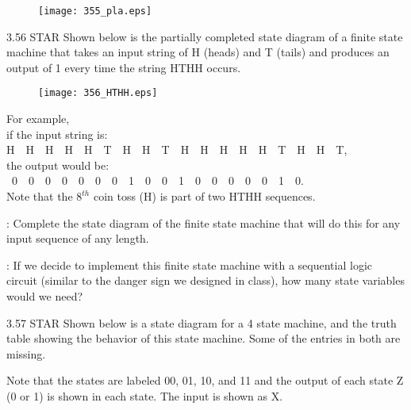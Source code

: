\documentclass{patt}
\begin{document}
\begin{exercises}
\vspace{0.2in}
\begin{figure}[h]
\centering
\texttt{[image: 355\_pla.eps]}
\end{figure}

\newpage

\item[3.56]STAR Shown below is the partially completed state diagram of a
finite state machine that takes an input string of H (heads) and T
(tails) and produces an output of 1 every time the string HTHH occurs.

\vspace{1in}
\begin{figure}[h]
\centering
    \texttt{[image: 356\_HTHH.eps]}
\end{figure}

\noindent For example,\\

        if the input string is: {\ttfamily H\ \ H\ \ H\ \
          H\ \ H\ \ T\ \ H\ \ H\ \ T\ \ H\ \ H\ \ H\ \ H\ \ H\ \ T\ \ H\
          \ H\ \ T},\\
\indent      the output would be: {\ttfamily \ 0\ \ 0\ \ 0\ \ 0\ \
0\ \ 0\ \ 0\ \ 1\ \ 0\ \ 0\ \ 1\ \ 0\ \ 0\ \ 0\ \ 0\ \ 0\ \ 1\ \ 0}.\\

\noindent Note that the $8^{th}$ coin toss (H) is part of two HTHH sequences.

\vspace{0.2in}

: Complete the state diagram of the finite state machine that will do this for any input sequence of any length.

\vspace{0.2in}

: If we decide to implement this finite state machine
with a sequential logic circuit (similar to the danger sign we designed
in class), how many state variables would we need?

\newpage

\item[3.57]STAR Shown below is a state diagram for a 4 state
machine, and the truth table showing the behavior of this state machine.
Some of the entries in both are missing.

\noindent Note that the states are labeled 00, 01, 10, and 11 and the output of
each state Z (0 or 1) is shown in each state.  The input is shown as X.


\end{exercises}
\end{document}
